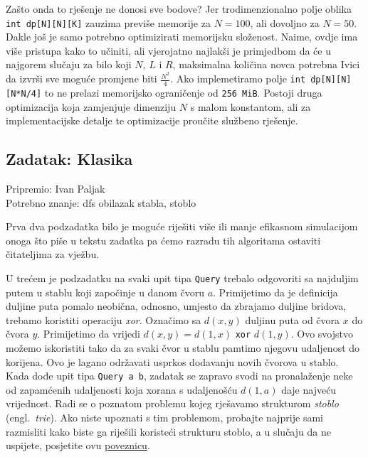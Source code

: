 \documentclass[a4paper]{article}
\begin{document}
Zašto onda to rješenje ne donosi sve bodove? Jer trodimenzionalno polje oblika
\texttt{int dp[N][N][K]} zauzima previše memorije za $N = 100$, ali dovoljno za
$N = 50$.  Dakle još je samo potrebno optimizirati memorijsku složenost. Naime,
ovdje ima više pristupa kako to učiniti, ali vjerojatno najlakši je primjedbom
da će u najgorem slučaju za bilo koji $N$, $L$ i $R$, maksimalna količina novca
potrebna Ivici da izvrši sve moguće promjene biti $\frac{N^2}{4}$. Ako
implemetiramo polje \texttt{int dp[N][N][N*N/4]} to ne prelazi memorijsko
ograničenje od \texttt{256 MiB}. Postoji druga optimizacija koja zamjenjuje
dimenziju $N$ s malom konstantom, ali za implementacijske detalje te
optimizacije proučite službeno rješenje.

\subsection*{Zadatak: Klasika}
\textsf{Pripremio: Ivan Paljak}\\
\textsf{Potrebno znanje: dfs obilazak stabla, stoblo}

Prva dva podzadatka bilo je moguće riješiti više ili manje efikasnom simulacijom
onoga što piše u tekstu zadatka pa ćemo razradu tih algoritama ostaviti
čitateljima za vježbu.

U trećem je podzadatku na svaki upit tipa \texttt{Query} trebalo odgovoriti sa
najduljim putem u stablu koji započinje u danom čvoru $a$. Primijetimo da je
definicija duljine puta pomalo neobična, odnosno, umjesto da zbrajamo duljine
bridova, trebamo koristiti operaciju \textit{xor}. Označimo sa $d(x, y)$
duljinu puta od čvora $x$ do čvora $y$. Primijetimo da vrijedi $d(x, y) = d(1,
x)$ \texttt{xor} $d(1, y)$. Ovo svojstvo možemo iskoristiti
tako da za svaki čvor u stablu pamtimo njegovu udaljenost do korijena. Ovo je
lagano održavati usprkos dodavanju novih čvorova u stablo. Kada dođe upit tipa
\texttt{Query a b}, zadatak se zapravo svodi na pronalaženje neke od zapamćenih
udaljenosti koja xorana s udaljenošću $d(1, a)$ daje najveću vrijednost. Radi
se o poznatom problemu kojeg rješavamo strukturom \textit{stoblo} (engl.\
\textit{trie}). Ako niste upoznati s tim problemom, probajte najprije sami
razmisliti kako biste ga riješili koristeći strukturu stoblo, a u slučaju da ne
uspijete, posjetite ovu
\href{https://www.hackerearth.com/practice/notes/lalitkundu95/tutorial-on-trie-and-example-problems/}{poveznicu}.
\end{document}
